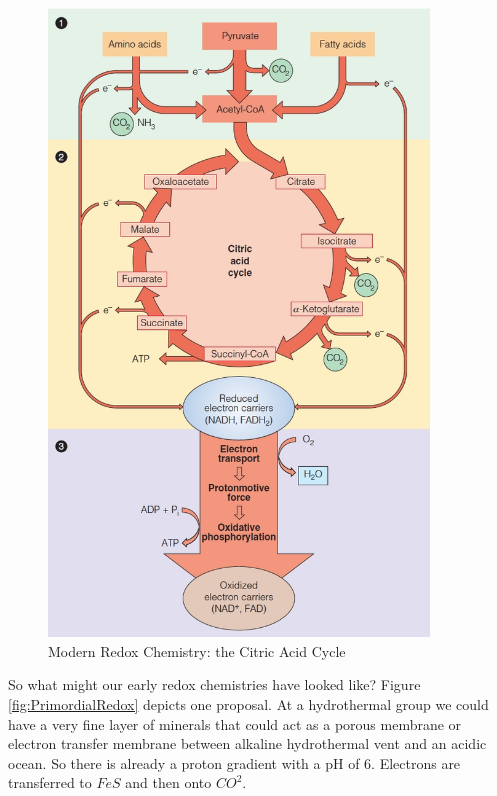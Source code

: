 \documentclass[]{article}
\begin{document}
\begin{figure}[H]
	\caption{Modern Redox Chemistry: the Citric Acid Cycle} \label{fig:ModernRedox} 
	\includegraphics[width=0.9\textwidth]{ModernRedox}
\end{figure}

So what might our early redox chemistries have looked like? Figure \ref{fig:PrimordialRedox} depicts one proposal. At a hydrothermal group we could have a very fine layer of minerals that could act as a porous membrane or electron transfer membrane between alkaline hydrothermal vent and an acidic ocean. So there is already a proton gradient with a pH of 6. Electrons are transferred to $FeS$ and then onto $CO^2$. 
\end{document}
